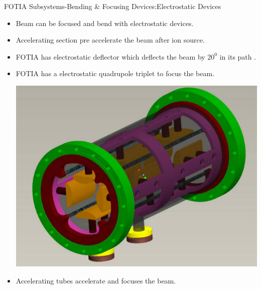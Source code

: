 \documentclass[11pt]{beamer}
\begin{document}
\begin{frame}{FOTIA Subsystems-Bending \& Focusing Devices:Electrostatic Devices}

 
 
  \begin{itemize} 
    \item Beam can be focused and bend with electrostatic devices.
    \item Accelerating section pre accelerate the beam after ion source.%
    \item FOTIA has electrostatic deflector which deflects the beam by $20^0$ in its path .
    \item FOTIA has a electrostatic quadrupole triplet to focus the beam.\\
      \begin{center}
    \includegraphics[scale=0.25]{eqt.jpg}
   \end{center}
    
    \item Accelerating tubes accelerate and focuses the beam.
    
   \end{itemize}

\end{frame}
\end{document}
